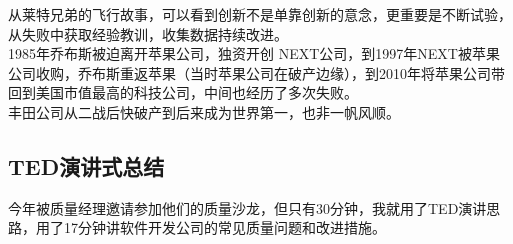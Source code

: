 从莱特兄弟的飞行故事，可以看到创新不是单靠创新的意念，更重要是不断试验，从失败中获取经验教训，收集数据持续改进。\\
1985年乔布斯被迫离开苹果公司，独资开创
NEXT公司，到1997年NEXT被苹果公司收购，乔布斯重返苹果（当时苹果公司在破产边缘），到2010年将苹果公司带回到美国市值最高的科技公司，中间也经历了多次失败。\\
丰田公司从二战后快破产到后来成为世界第一，也非一帆风顺。\\

\hypertarget{tedux6f14ux8bb2ux5f0fux603bux7ed3}{%
\subsection{TED演讲式总结}\label{tedux6f14ux8bb2ux5f0fux603bux7ed3}}

今年被质量经理邀请参加他们的质量沙龙，但只有30分钟，我就用了TED演讲思路，用了17分钟讲软件开发公司的常见质量问题和改进措施。

